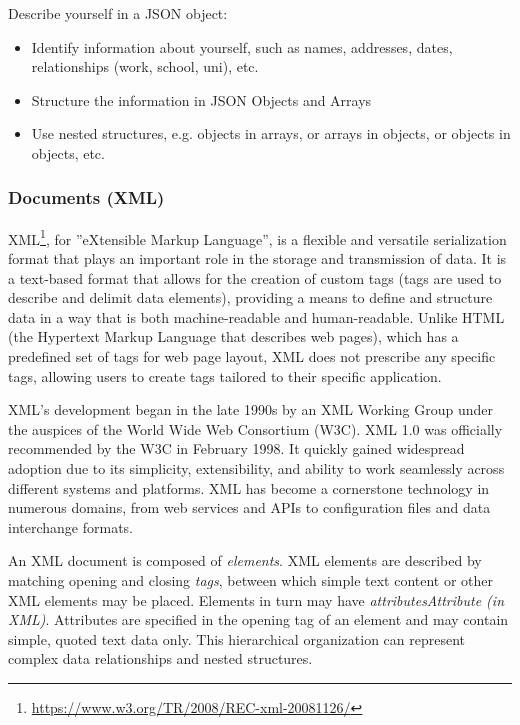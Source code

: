 \begin{exerciseboxpaper}

Describe yourself in a JSON object:
\begin{itemize}
	\item Identify information about yourself, such as names, addresses, dates, relationships (work, school, uni), etc.
	\item Structure the information in JSON Objects and Arrays 
	\item Use nested structures, e.g. objects in arrays, or arrays in objects, or objects in objects, etc.
\end{itemize}
\end{exerciseboxpaper}

\subsubsection*{Documents (XML)}

XML\footnote{\url{https://www.w3.org/TR/2008/REC-xml-20081126/}}, for ''eXtensible Markup Language'', is a flexible and versatile serialization format that plays an important role in the storage and transmission of data. It is a text-based format that allows for the creation of custom tags (tags are used to describe and delimit data elements), providing a means to define and structure data in a way that is both machine-readable and human-readable. Unlike HTML (the Hypertext Markup Language that describes web pages), which has a predefined set of tags for web page layout, XML does not prescribe any specific tags, allowing users to create tags tailored to their specific application.

XML's development began in the late 1990s by an XML Working Group under the auspices of the World Wide Web Consortium (W3C). XML 1.0 was officially recommended by the W3C in February 1998. It quickly gained widespread adoption due to its simplicity, extensibility, and ability to work seamlessly across different systems and platforms. XML has become a cornerstone technology in numerous domains, from web services and APIs to configuration files and data interchange formats.

An XML document is composed of \emph{elements}. XML elements are described by matching opening and closing \emph{tags}, between which simple text content or other XML elements may be placed. Elements in turn may have \emph{attributes}\emph{Attribute (in XML)}. Attributes are specified in the opening tag of an element and may contain simple, quoted text data only. This hierarchical organization can represent complex data relationships and nested structures. 

